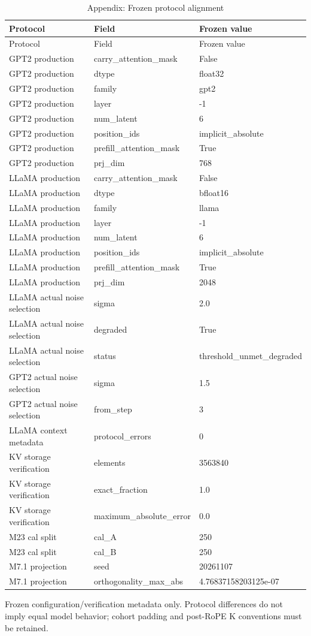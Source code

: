 \begingroup\scriptsize\setlength{\tabcolsep}{3pt}
\begin{longtable}{@{}p{}p{}p{}@{}}
\caption{Appendix: Frozen protocol alignment}\label{tab:appendix-protocol}\\
\toprule
Protocol & Field & Frozen value \\
\midrule\endfirsthead
\toprule
Protocol & Field & Frozen value \\
\midrule\endhead
GPT2 production & carry\_attention\_mask & False \\
GPT2 production & dtype & float32 \\
GPT2 production & family & gpt2 \\
GPT2 production & layer & -1 \\
GPT2 production & num\_latent & 6 \\
GPT2 production & position\_ids & implicit\_absolute \\
GPT2 production & prefill\_attention\_mask & True \\
GPT2 production & prj\_dim & 768 \\
LLaMA production & carry\_attention\_mask & False \\
LLaMA production & dtype & bfloat16 \\
LLaMA production & family & llama \\
LLaMA production & layer & -1 \\
LLaMA production & num\_latent & 6 \\
LLaMA production & position\_ids & implicit\_absolute \\
LLaMA production & prefill\_attention\_mask & True \\
LLaMA production & prj\_dim & 2048 \\
LLaMA actual noise selection & sigma & 2.0 \\
LLaMA actual noise selection & degraded & True \\
LLaMA actual noise selection & status & threshold\_unmet\_degraded \\
GPT2 actual noise selection & sigma & 1.5 \\
GPT2 actual noise selection & from\_step & 3 \\
LLaMA context metadata & protocol\_errors & 0 \\
KV storage verification & elements & 3563840 \\
KV storage verification & exact\_fraction & 1.0 \\
KV storage verification & maximum\_absolute\_error & 0.0 \\
M23 cal split & cal\_A & 250 \\
M23 cal split & cal\_B & 250 \\
M7.1 projection & seed & 20261107 \\
M7.1 projection & orthogonality\_max\_abs & 4.76837158203125e-07 \\
\bottomrule
\end{longtable}
\noindent Frozen configuration/verification metadata only. Protocol differences do not imply equal model behavior; cohort padding and post-RoPE K conventions must be retained.
\endgroup
